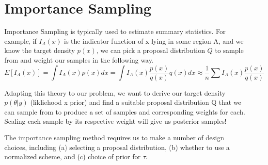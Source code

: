 \documentclass[12pt,letterpaper,twoside]{article}
\begin{document}
\section{Importance Sampling}

Importance Sampling is typically used to estimate summary statistics. 
For example, if $I_A(x)$ is the indicator function of x lying in 
some region A, and we know the target density $p(x)$, we can pick a 
proposal distribution $Q$ to sample from and weight our samples 
in the following way.
$$ E[I_A(x)] = \int I_A(x) p(x) dx = \int I_A(x) \frac{p(x)}{q(x)} q(x) dx \approx \frac{1}{n} \sum I_A(x) \frac{p(x)}{q(x)} $$ 

Adapting this theory to our problem, we want to derive our target 
density $p(\theta|y)$ (likliehood x prior) and find a suitable 
proposal distribution Q that we can sample from to produce a set 
of samples and corresponding weights for each. Scaling each sample 
by its respective weight will give us posterior samples! \newline

The importance sampling method requires us to make a number of design 
choices, including (a) selecting a proposal distribution, (b) whether to 
use a normalized scheme, and (c) choice of prior for $\tau$.
\end{document}
